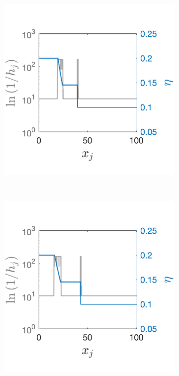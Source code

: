 \documentclass[final]{amsart}
\numberwithin{equation}{section}
\begin{document}
\begin{figure}[H]
\begin{subfigure}[b]{.25\textwidth}
	\caption{
		\label{fig_shw_dambreakSHW_dambreak_RK3_WENO3_rec_3_fixed_gs_stills_2001_adaptONOFF}
	}
\end{subfigure}
	\begin{subfigure}[b]{.25\textwidth}
	\includegraphics[width=\textwidth]{../figures/fig_shw_dambreakSHW_dambreak_RK3_WENO3_rec_3_fixed_gs_stills_3001_adaptONOFF}	
	\caption{
		\label{fig_shw_dambreakSHW_dambreak_RK3_WENO3_rec_3_fixed_gs_stills_3001_adaptONOFF}
	}
\end{subfigure}
	\\
\begin{subfigure}[b]{.25\textwidth}
	\includegraphics[width=\textwidth]{../figures/fig_shw_dambreakSHW_dambreak_RK3_WENO3_rec_3_fixed_gs_stills_4001_adaptONOFF}	

\end{subfigure}
\end{figure}
\end{document}
